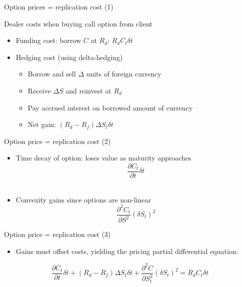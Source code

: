 \begin{frame}{Option prices = replication cost (1)}

Dealer costs when buying call option from client

\begin{itemize}
\tightlist
\item
  Funding cost: borrow \(C\) at \(R_d\): \(R_d C_t \delta t\)\\
\item
  Hedging cost (using delta-hedging)

  \begin{itemize}
  \tightlist
  \item
    Borrow and sell \(\Delta\) units of foreign currency
  \item
    Receive \(\Delta S\) and reinvest at \(R_d\)
  \item
    Pay accrued interest on borrowed amount of currency
  \item
    Net gain: \((R_d - R_f)\Delta S_t \delta t\)
  \end{itemize}
\end{itemize}

\end{frame}

\begin{frame}{Option price = replication cost (2)}

\begin{itemize}
\tightlist
\item
  Time decay of option: loses value as maturity approaches
  \[\frac{\partial C_t}{\partial t} \delta t\]\\
  \hspace*{0.333em}
\item
  Convexity gains since options are non-linear
  \[ \frac{\partial^2 C_t}{\partial S^2}(\delta S_t)^2\]
\end{itemize}

\end{frame}

\begin{frame}{Option price = replication cost (3)}

\begin{itemize}
\tightlist
\item
  Gains must offset costs, yielding the pricing partial differential
  equation:
\end{itemize}

\[
\frac{\partial C_t}{\partial t} \delta t + (R_d - R_f) \Delta S_t  \delta t + \frac{\partial^2 C}{\partial S_t^2} (\delta S_t)^2 = R_d C_t \delta t
\]

\end{frame}

